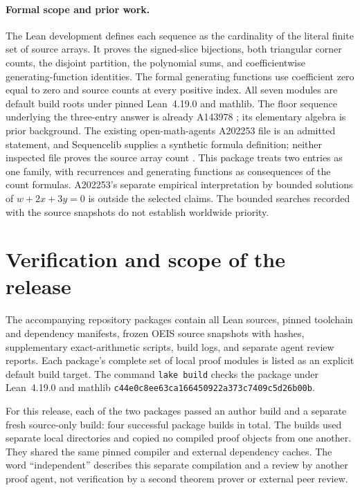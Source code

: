 \documentclass[11pt]{article}
\begin{document}
\paragraph{Formal scope and prior work.}
The Lean development defines each sequence as the cardinality of the
literal finite set of source arrays. It proves the signed-slice
bijections, both triangular corner counts, the disjoint partition,
the polynomial sums, and coefficientwise generating-function
identities. The formal generating functions use coefficient zero
equal to zero and source counts at every positive index. All seven
modules are default build roots under pinned Lean~4.19.0 and mathlib.
The floor sequence underlying the three-entry answer is already
A143978 \cite{a202253-floor}; its elementary algebra is prior
background. The existing open-math-agents A202253 file is an admitted
statement, and Sequencelib supplies a synthetic formula definition;
neither inspected file proves the source array count
\cite{a202253-oma,a202253-sequencelib}. This package treats two entries
as one family, with recurrences and generating functions as
consequences of the count formulas. A202253's separate empirical
interpretation by bounded solutions of $w+2x+3y=0$ is outside the
selected claims. The bounded searches recorded with the source
snapshots do not establish worldwide priority.

\section{Verification and scope of the release}

The accompanying repository packages contain all Lean sources, pinned
toolchain and dependency manifests, frozen OEIS source snapshots with
hashes, supplementary exact-arithmetic scripts, build logs, and separate
agent review reports. Each package's complete set of local proof modules
is listed as an explicit default build target. The command
\texttt{lake build} checks the package under Lean~4.19.0 and mathlib
\texttt{c44e0c8ee63ca166450922a373c7409c5d26b00b}.

For this release, each of the two packages passed an author build and
a separate fresh source-only build: four successful package builds in
total. The builds used separate local directories and copied no compiled
proof objects from one another. They shared the same pinned compiler and
external dependency caches. The word ``independent'' describes this
separate compilation and a review by another proof agent, not verification
by a second theorem prover or external peer review.
\end{document}
